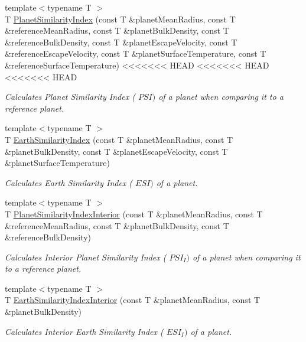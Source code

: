 \begin{DoxyCompactItemize}
{\footnotesize template$<$typename T $>$ }\\T \hyperlink{group___astrophysics_ga62e8b781c301df60bd04af3183a965eb}{Planet\+Similarity\+Index} (const T \&planet\+Mean\+Radius, const T \&reference\+Mean\+Radius, const T \&planet\+Bulk\+Density, const T \&reference\+Bulk\+Density, const T \&planet\+Escape\+Velocity, const T \&reference\+Escape\+Velocity, const T \&planet\+Surface\+Temperature, const T \&reference\+Surface\+Temperature)
<<<<<<< HEAD
<<<<<<< HEAD
<<<<<<< HEAD
\begin{DoxyCompactList}\small\item\em Calculates Planet Similarity Index ( $PSI)$ of a planet when comparing it to a reference planet. \end{DoxyCompactList}\item 
{\footnotesize template$<$typename T $>$ }\\T \hyperlink{group___astrophysics_ga4b86397b1c839c49ac599d49fda207d4}{Earth\+Similarity\+Index} (const T \&planet\+Mean\+Radius, const T \&planet\+Bulk\+Density, const T \&planet\+Escape\+Velocity, const T \&planet\+Surface\+Temperature)
\begin{DoxyCompactList}\small\item\em Calculates Earth Similarity Index ( $ESI)$ of a planet. \end{DoxyCompactList}\item 
{\footnotesize template$<$typename T $>$ }\\T \hyperlink{group___astrophysics_ga6dc06a1a8baf6e132abed51fcf410c7f}{Planet\+Similarity\+Index\+Interior} (const T \&planet\+Mean\+Radius, const T \&reference\+Mean\+Radius, const T \&planet\+Bulk\+Density, const T \&reference\+Bulk\+Density)
\begin{DoxyCompactList}\small\item\em Calculates Interior Planet Similarity Index ( $PSI_I)$ of a planet when comparing it to a reference planet. \end{DoxyCompactList}\item 
{\footnotesize template$<$typename T $>$ }\\T \hyperlink{group___astrophysics_ga699bcc2f17b8855eaa856595d8032f61}{Earth\+Similarity\+Index\+Interior} (const T \&planet\+Mean\+Radius, const T \&planet\+Bulk\+Density)
\begin{DoxyCompactList}\small\item\em Calculates Interior Earth Similarity Index ( $ESI_I)$ of a planet. \end{DoxyCompactList}\item 

\end{DoxyCompactItemize}
